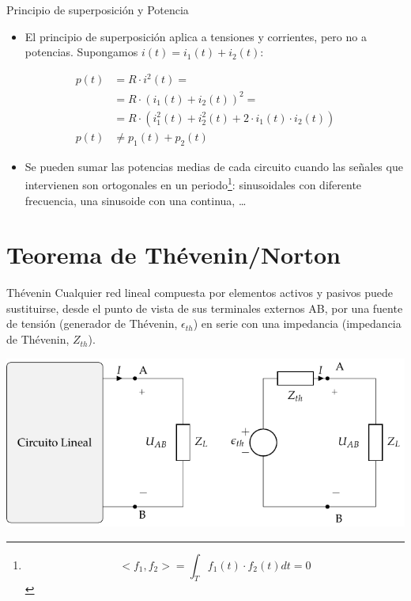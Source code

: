 \documentclass[xcolor={usenames,svgnames,dvipsnames}]{beamer}
\begin{document}
\begin{frame}[label={sec:orgf8b43a5}]{Principio de superposición y Potencia}
\begin{itemize}
\item El principio de superposición aplica a tensiones y corrientes, pero \alert{no} a potencias. Supongamos \(i(t) = i_1(t) + i_2(t)\):
\end{itemize}
\begin{align*}
  p(t) &= R \cdot i^2(t) =\\
       &= R \cdot (i_1(t) + i_2(t))^2 =\\
       &=R \cdot (i_1^2(t) + i_2^2(t) + 2\cdot i_1(t) \cdot i_2(t))\\
  p(t) &\neq p_1(t) + p_2(t)
\end{align*}
\begin{itemize}
\item Se pueden sumar las potencias \alert{medias} de cada circuito cuando las señales que intervienen son ortogonales en un periodo\footnote{\[<f_1, f_2> = \int_T f_1(t) \cdot f_2(t) dt = 0\]}: sinusoidales con diferente frecuencia, una sinusoide con una continua, \ldots{}
\end{itemize}
\end{frame}



\section{Teorema de Thévenin/Norton}
\label{sec:orgc9bee87}

\begin{frame}[label={sec:orga8d0372}]{Thévenin}
Cualquier \alert{red lineal} compuesta por elementos activos y pasivos puede sustituirse, desde el punto de vista de sus terminales externos AB, por una \alert{fuente de tensión} (generador de Thévenin, \(\epsilon_{th}\)) en \alert{serie} con una impedancia (impedancia de Thévenin, \(Z_{th}\)).

\begin{center}
\includegraphics[width=.9\linewidth]{figs/EquivalenteThevenin.pdf}
\end{center}
\end{frame}
\end{document}
